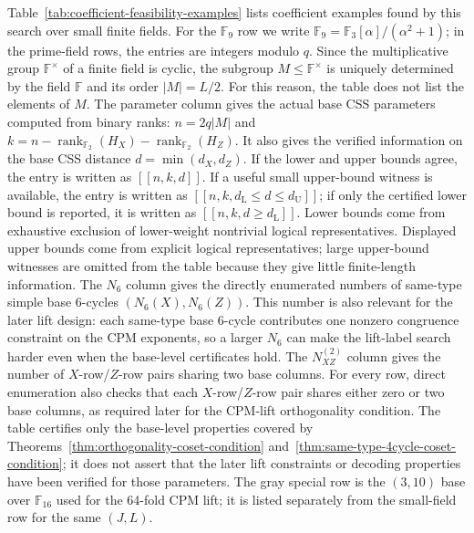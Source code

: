 \documentclass[11pt,a4paper]{article}
\newcommand{\F}{\mathbb{F}}
\newcommand{\HX}{H_X}
\newcommand{\HZ}{H_Z}
\theoremstyle{uprighttheorem}
\begin{document}
Table~\ref{tab:coefficient-feasibility-examples} lists coefficient examples found by this search over small finite fields.
For the \(\F_9\) row we write \(\F_9=\F_3[\alpha]/(\alpha^2+1)\); in the prime-field rows, the entries are integers modulo \(q\).
Since the multiplicative group \(\F^\times\) of a finite field is cyclic, the subgroup \(M\le\F^\times\) is uniquely determined by the field \(\F\) and its order \(|M|=L/2\).
For this reason, the table does not list the elements of \(M\).
The parameter column gives the actual base CSS parameters computed from binary ranks:
\(n=2q|M|\) and \(k=n-\operatorname{rank}_{\F_2}(\HX)-\operatorname{rank}_{\F_2}(\HZ)\).
It also gives the verified information on the base CSS distance \(d=\min(d_X,d_Z)\).
If the lower and upper bounds agree, the entry is written as \([[n,k,d]]\).
If a useful small upper-bound witness is available, the entry is written as \([[n,k,d_{\mathrm L}\le d\le d_{\mathrm U}]]\); if only the certified lower bound is reported, it is written as \([[n,k,d\ge d_{\mathrm L}]]\).
Lower bounds come from exhaustive exclusion of lower-weight nontrivial logical representatives.
Displayed upper bounds come from explicit logical representatives; large upper-bound witnesses are omitted from the table because they give little finite-length information.
The \(N_6\) column gives the directly enumerated numbers of same-type simple base 6-cycles \((N_6(X),N_6(Z))\).
This number is also relevant for the later lift design: each same-type base 6-cycle contributes one nonzero congruence constraint on the CPM exponents, so a larger \(N_6\) can make the lift-label search harder even when the base-level certificates hold.
The \(N_{XZ}^{(2)}\) column gives the number of \(X\)-row/\(Z\)-row pairs sharing two base columns.
For every row, direct enumeration also checks that each \(X\)-row/\(Z\)-row pair shares either zero or two base columns, as required later for the CPM-lift orthogonality condition.
The table certifies only the base-level properties covered by Theorems~\ref{thm:orthogonality-coset-condition} and~\ref{thm:same-type-4cycle-coset-condition}; it does not assert that the later lift constraints or decoding properties have been verified for those parameters.
The gray special row is the \((3,10)\) base over \(\F_{16}\) used for the 64-fold CPM lift; it is listed separately from the small-field row for the same \((J,L)\).
\end{document}
